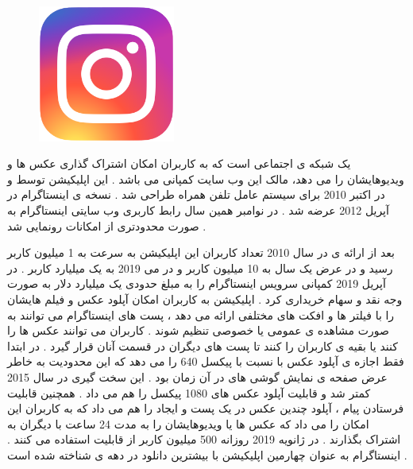 \documentclass[12pt]{book}
\begin{document}
\begin{figure}
  \vspace{80pt}
  \begin{center}
    \includegraphics[width=0.4\textwidth]{./600px-Instagram_logo_2016.svg.png}
  \end{center}
  \vspace{-20pt}
  \caption{}
  \vspace{-120pt}
\end{figure}


یک شبکه ی اجتماعی است که به کاربران امکان اشتراک گذاری عکس ها و ویدیوهایشان را می دهد، مالک این وب سایت کمپانی 
می باشد .
این اپلیکیشن توسط
و
در اکتبر 2010 برای سیستم عامل تلفن همراه 
طراحی شد .
نسخه ی 
اینستاگرام در آپریل 2012 عرضه شد .
در نوامبر همین سال رابط کاربری وب سایتی اینستاگرام به صورت محدودتری از امکانات رونمایی شد .

بعد از ارائه ی 
در سال 2010 تعداد کاربران این اپلیکیشن به سرعت به 1 میلیون کاربر رسید و در عرض یک سال به 10 میلیون کاربر و در می 2019 به یک میلیارد کاربر .
در آپریل 2019 کمپانی 
سرویس اینستاگرام را به مبلغ حدودی یک میلیارد دلار به صورت وجه نقد و سهام خریداری کرد .
اپلیکیشن 
به کاربران امکان آپلود عکس و فیلم هایشان را با فیلتر ها و افکت های مختلفی ارائه می دهد ، پست های اینستاگرام می توانند به صورت مشاهده ی عمومی یا خصوصی تنظیم شوند .
کاربران می توانند عکس ها را 
کنند یا بقیه ی کاربران را
کنند تا پست های دیگران در قسمت 
آنان قرار گیرد .
در ابتدا 
فقط اجازه ی آپلود عکس با نسبت 
با پیکسل 640 را می دهد که این محدودیت به خاطر عرض صفحه ی نمایش گوشی های 
در آن زمان بود .
این سخت گیری در سال 2015 کمتر شد و قابلیت آپلود عکس های 1080 پیکسل را هم می داد .
همچنین قابلیت فرستادن پیام ، آپلود چندین عکس در یک پست و ایجاد
را هم می داد که به کاربران این امکان را می داد که عکس ها یا ویدیوهایشان را به مدت 24 ساعت با دیگران به اشتراک بگذارند .
در ژانویه 2019 روزانه 500 میلیون کاربر از قابلیت 
استفاده می کنند .
اینستاگرام به عنوان چهارمین اپلیکیشن با بیشترین دانلود در دهه ی 
شناخته شده است .
\end{document}
